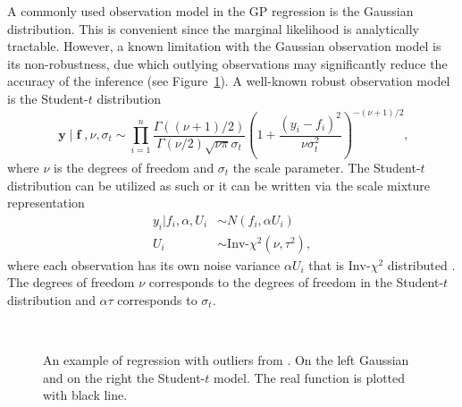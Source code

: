 \documentclass[twoside,11pt]{article}
\DeclareMathOperator{\f}{\mathbf{f}}
\DeclareMathOperator{\y}{\mathbf{y}}
\begin{document}
A commonly used observation model in the GP regression is the Gaussian
distribution. This is convenient since the marginal likelihood is
analytically tractable. However, a known limitation with the Gaussian
observation model is its non-robustness, due which outlying
observations may significantly reduce the accuracy of the inference
(see Figure~\ref{single_obs_figure}).  A well-known robust observation
model is the Student-$t$ distribution \citep{OHagan:1979}
%
\begin{equation}
 \y | \f, \nu, \sigma_t  \sim \prod_{i=1}^n \frac{\Gamma((\nu+1)/2)}{\Gamma(\nu/2)\sqrt{\nu\pi}\sigma_t}\left(1 +
  \frac{(y_i-f_i)^2}{\nu\sigma_t^2} \right)^{-(\nu+1)/2},
\end{equation}
%
where $\nu$ is the degrees of freedom and $\sigma_t$ the scale
parameter.  The Student-$t$ distribution can be utilized as such or it
can be written via the scale mixture representation
%
\begin{align}
y_i | f_i,\alpha, U_i & \sim N(f_i, \alpha U_i) \label{eq_scale_mixture_1}\\
U_i & \sim \text{Inv-}\chi^2(\nu, \tau^2), \label{eq_scale_mixture_2}
\end{align}
%
where each observation has its own noise variance $\alpha U_i$ that is
$\text{Inv-}\chi^2$ distributed
\citep{Neal:1997,Gelman+etal+BDA3:2013}. The degrees of freedom $\nu$
corresponds to the degrees of freedom in the Student-$t$ distribution
and $\alpha\tau$ corresponds to $\sigma_t$.

\begin{figure}
  \begin{center}
    ~
  \end{center}\caption{An example of regression with outliers from
    \citep{Neal:1997}. On the left Gaussian and on the right the
    Student-$t$ model.  The real function is plotted with
    black line.}
  \label{single_obs_figure} 
\end{figure}
\end{document}
